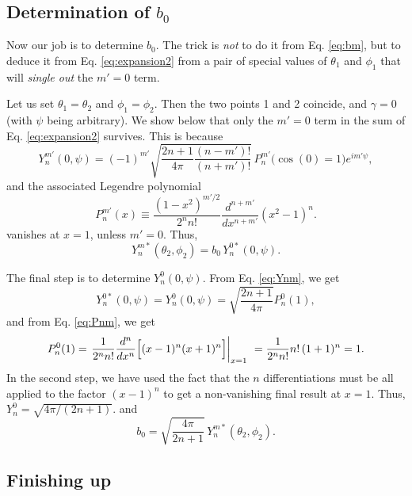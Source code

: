 \documentclass[11pt]{article}
\begin{document}
\subsection{Determination of $b_0$}


Now our job is to determine $b_0$.
The trick is \emph{not} to do it from Eq. \eqref{eq:bm},
but to deduce it from Eq. \eqref{eq:expansion2}
from a pair of special values of $\theta_1$ and $\phi_1$
that will \emph{single out} the $m' = 0$ term.

Let us set $\theta_1 = \theta_2$ and $\phi_1 = \phi_2$.
Then the two points 1 and 2 coincide,
and $\gamma = 0$ (with $\psi$ being arbitrary).
%
We show below that only the $m' = 0$ term in the sum
of Eq. \eqref{eq:expansion2} survives.
%
This is because
\begin{equation}
  Y_n^{m'}(0, \psi)
=
  (-1)^{m'}
  \sqrt{
    \frac{ 2 n + 1 } { 4 \pi }
    \frac{ (n - m')! } { (n + m')! }
  }
  \,
  P_{n}^{m'}\bigl( \cos(0) = 1 \bigr) e^{i m' \psi},
  \label{eq:Ynm}
\end{equation}
and the associated Legendre polynomial
\begin{equation}
  P_{n}^{m'}(x)
\equiv
  \frac{ (1 - x^2)^{m'/2} } { 2^{n} n! }
  \frac{ d^{n+m'} } { d x^{n+m'} } (x^2 - 1)^{n}.
  \label{eq:Pnm}
\end{equation}
vanishes at $x = 1$, unless $m' = 0$.
Thus,
\[
Y_n^{m*}(\theta_2, \phi_2)
=
b_0 \, Y_n^{0*}(0, \psi).
\]

The final step is to determine $Y_n^0(0, \psi)$.
From Eq. \eqref{eq:Ynm}, we get
\[
  Y_n^{0*}(0, \psi)
=
  Y_n^0(0, \psi)
=
  \sqrt{
    \frac { 2 n + 1 } { 4 \pi }
  }
  P_{n}^0(1),
\]
and
from Eq. \eqref{eq:Pnm}, we get
\[
  P_{n}^{0}(1)
=
  \left.
  \frac{ 1 } { 2^{n} n! }
  \frac{ d^{n} } { d x^{n} }
  \Bigl[
    (x - 1)^{n}
    (x + 1)^{n}
  \Bigr]
  \right|_{x = 1}\
= \frac{ 1 } { 2^{n} n! }
  n! \, (1 + 1)^n
= 1.
\]
In the second step,
we have used the fact that
the $n$ differentiations must be
all applied to the factor $(x - 1)^n$
to get a non-vanishing final result at $x = 1$.
%
Thus,
$Y_n^0 = \sqrt{4\pi/(2n+1)}$.
and
\begin{equation}
b_0 = \sqrt{ \frac {4 \pi} { 2 n + 1 } } \, Y_n^{m*}(\theta_2, \phi_2).
\label{eq:b0}
\end{equation}



\subsection{Finishing up}
\end{document}
